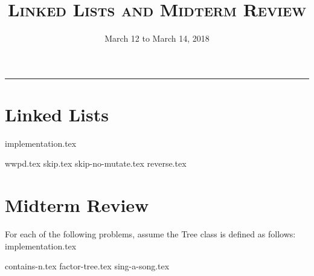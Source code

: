 \documentclass{exam}
\title{\textsc{Linked Lists and Midterm Review}}
\date{March 12 to March 14, 2018}
\begin{document}
\maketitle
\rule{\textwidth}{0.15em}
\fontsize{12}{15}\selectfont

\section{Linked Lists}
{implementation.tex}
\begin{questions}
\newpage
{wwpd.tex}
\newpage
{skip.tex}
{skip-no-mutate.tex}
\newpage
{reverse.tex}
\end{questions}

\section{Midterm Review}
For each of the following problems, assume the Tree class is defined as follows:
\vspace{2\baselineskip}
{implementation.tex}
\vspace{\baselineskip}
\begin{questions}
{contains-n.tex}
\newpage
{factor-tree.tex}
\newpage
{sing-a-song.tex}
\end{questions}
\end{document}
